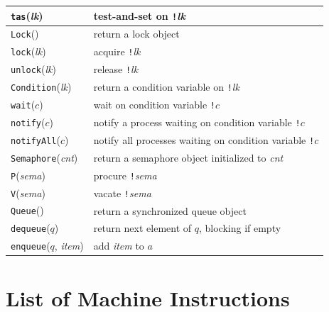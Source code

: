 \documentclass{report}
\begin{document}
\vspace{1em}
\begin{tabular}{|l|l|}
\hline
\texttt{tas}(\textit{lk}) & test-and-set on \texttt{!{}}\textit{lk} \\
\hline
\texttt{Lock}() & return a lock object \\
\hline
\texttt{lock}(\textit{lk}) & acquire \texttt{!{}}\textit{lk} \\
\hline
\texttt{unlock}(\textit{lk}) & release \texttt{!{}}\textit{lk} \\
\hline
\texttt{Condition}(\textit{lk}) & return a condition variable on \texttt{!{}}\textit{lk} \\
\hline
\texttt{wait}($c$) & wait on condition variable \texttt{!{}}$c$ \\
\hline
\texttt{notify}($c$) & notify a process waiting on condition variable \texttt{!{}}$c$ \\
\hline
\texttt{notifyAll}($c$) & notify all processes waiting on condition variable \texttt{!{}}$c$ \\
\hline
\texttt{Semaphore}(\textit{cnt}) & return a semaphore object initialized to \textit{cnt} \\
\hline
\texttt{P}(\textit{sema}) & procure \texttt{!{}}\textit{sema}  \\
\hline
\texttt{V}(\textit{sema}) & vacate \texttt{!{}}\textit{sema}  \\
\hline
\texttt{Queue}() & return a synchronized queue object \\
\hline
\texttt{dequeue}($q$) & return next element of $q$, blocking if empty \\
\hline
\texttt{enqueue}($q$, \textit{item}) & add \textit{item} to $a$ \\
\hline
\end{tabular}

\chapter{List of Machine Instructions}
\label{ap:harmonybytecode}
\end{document}
